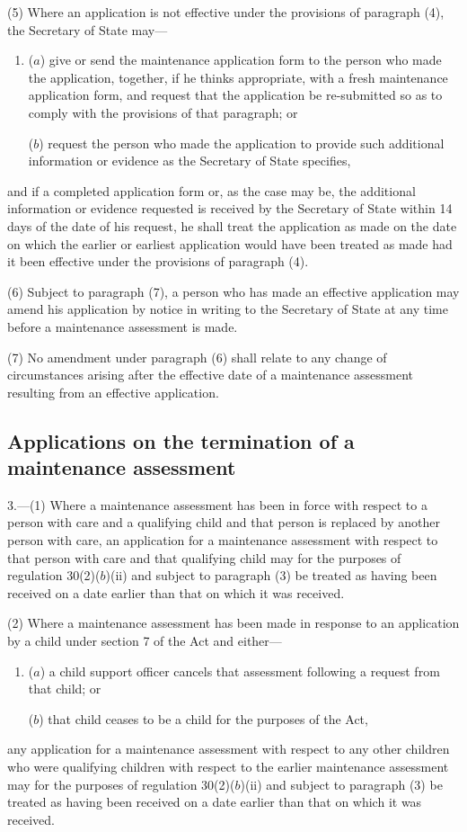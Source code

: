 \documentclass[a4paper]{article}
\begin{document}
(5) Where an application is not effective under the provisions of paragraph (4), the Secretary of State may—
\begin{enumerate}\item[]
($a$) give or send the maintenance application form to the person who made the application, together, if he thinks appropriate, with a fresh maintenance application form, and request that the application be re-submitted so as to comply with the provisions of that paragraph; or

($b$) request the person who made the application to provide such additional information or evidence as the Secretary of State specifies,
\end{enumerate}
and if a completed application form or, as the case may be, the additional information or evidence requested is received by the Secretary of State within 14 days of the date of his request, he shall treat the application as made on the date on which the earlier or earliest application would have been treated as made had it been effective under the provisions of paragraph (4).

(6) Subject to paragraph (7), a person who has made an effective application may amend his application by notice in writing to the Secretary of State at any time before a maintenance assessment is made.

(7) No amendment under paragraph (6) shall relate to any change of circumstances arising after the effective date of a maintenance assessment resulting from an effective application.

\subsection[3. Applications on the termination of a maintenance assessment]{Applications on the termination of a maintenance assessment}

3.—(1) Where a maintenance assessment has been in force with respect to a person with care and a qualifying child and that person is replaced by another person with care, an application for a maintenance assessment with respect to that person with care and that qualifying child may for the purposes of regulation 30(2)($b$)(ii) and subject to paragraph (3) be treated as having been received on a date earlier than that on which it was received.

(2) Where a maintenance assessment has been made in response to an application by a child under section 7 of the Act and either—
\begin{enumerate}\item[]
($a$) a child support officer cancels that assessment following a request from that child; or

($b$) that child ceases to be a child for the purposes of the Act,
\end{enumerate}
any application for a maintenance assessment with respect to any other children who were qualifying children with respect to the earlier maintenance assessment may for the purposes of regulation 30(2)($b$)(ii) and subject to paragraph (3) be treated as having been received on a date earlier than that on which it was received.
\end{document}
